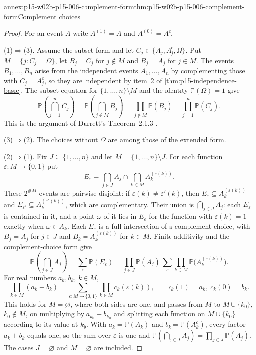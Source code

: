 \begin{annexitem}{annex:p15-w02b-p15-006-complement-form}{thm:p15-w02b-p15-006-complement-form}{Complement choices}
\begin{proof}
For an event \(A\) write \(A^{(1)}=A\) and \(A^{(0)}=A^c\).

(1)\(\Rightarrow\)(3). Assume the subset form and let
\(C_j\in\{A_j,A_j^c,\Omega\}\). Put \(M=\{j:C_j=\Omega\}\), let
\(B_j=C_j\) for \(j\notin M\) and \(B_j=A_j\) for \(j\in M\). The
events \(B_1,\ldots,B_n\) arise from the independent events
\(A_1,\ldots,A_n\) by complementing those with \(C_j=A_j^c\), so they
are independent by item~2 of \cref{thm:p15-independence-basic}. The
subset equation for \(\{1,\ldots,n\}\setminus M\) and the identity
\(\mathbb P(\Omega)=1\) give
\[
 \mathbb P\left(\bigcap_{j=1}^nC_j\right)
   =\mathbb P\left(\bigcap_{j\notin M}B_j\right)
   =\prod_{j\notin M}\mathbb P(B_j)
   =\prod_{j=1}^n\mathbb P(C_j).
\]
This is the argument of Durrett's Theorem~2.1.3
\cite[pp.~44--45]{DurrettPTEAuthor2019}.

(3)\(\Rightarrow\)(2). The choices without \(\Omega\) are among those
of the extended form.

(2)\(\Rightarrow\)(1). Fix \(J\subseteq\{1,\ldots,n\}\) and let
\(M=\{1,\ldots,n\}\setminus J\). For each function
\(\varepsilon:M\to\{0,1\}\) put
\[
 E_\varepsilon=\bigcap_{j\in J}A_j\cap\bigcap_{k\in M}A_k^{(\varepsilon(k))}.
\]
These \(2^{\#M}\) events are pairwise disjoint: if
\(\varepsilon(k)\neq\varepsilon'(k)\), then \(E_\varepsilon\subseteq
A_k^{(\varepsilon(k))}\) and \(E_{\varepsilon'}\subseteq
A_k^{(\varepsilon'(k))}\), which are complementary. Their union is
\(\bigcap_{j\in J}A_j\): each \(E_\varepsilon\) is contained in it, and a
point \(\omega\) of it lies in \(E_\varepsilon\) for the function with
\(\varepsilon(k)=1\) exactly when \(\omega\in A_k\). Each
\(E_\varepsilon\) is a full intersection of a complement choice, with
\(B_j=A_j\) for \(j\in J\) and \(B_k=A_k^{(\varepsilon(k))}\) for
\(k\in M\). Finite additivity and the complement-choice form give
\[
 \mathbb P\left(\bigcap_{j\in J}A_j\right)
   =\sum_{\varepsilon}\mathbb P(E_\varepsilon)
   =\prod_{j\in J}\mathbb P(A_j)\,
    \sum_{\varepsilon}\prod_{k\in M}\mathbb P\bigl(A_k^{(\varepsilon(k))}\bigr).
\]
For real numbers \(a_k,b_k\), \(k\in M\),
\[
 \prod_{k\in M}(a_k+b_k)=\sum_{\varepsilon:M\to\{0,1\}}
       \prod_{k\in M}c_k(\varepsilon(k)),
 \qquad c_k(1)=a_k,\ c_k(0)=b_k.
\]
This holds for \(M=\varnothing\), where both sides are one, and passes
from \(M\) to \(M\cup\{k_0\}\), \(k_0\notin M\), on multiplying by
\(a_{k_0}+b_{k_0}\) and splitting each function on \(M\cup\{k_0\}\)
according to its value at \(k_0\). With \(a_k=\mathbb P(A_k)\) and
\(b_k=\mathbb P(A_k^c)\), every factor \(a_k+b_k\) equals one, so the
sum over \(\varepsilon\) is one and
\(\mathbb P(\bigcap_{j\in J}A_j)=\prod_{j\in J}\mathbb P(A_j)\). The
cases \(J=\varnothing\) and \(M=\varnothing\) are included.


\end{proof}
\end{annexitem}
